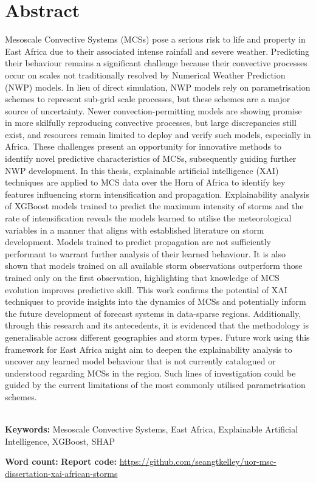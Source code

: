 \chapter*{\center \Large  Abstract}

\noindent
Mesoscale Convective Systems (MCSs) pose a serious risk to life and property in East Africa due to their associated intense rainfall and severe weather. Predicting their behaviour remains a significant challenge because their convective processes occur on scales not traditionally resolved by Numerical Weather Prediction (NWP) models. In lieu of direct simulation, NWP models rely on parametrisation schemes to represent sub-grid scale processes, but these schemes are a major source of uncertainty. Newer convection-permitting models are showing promise in more skilfully reproducing convective processes, but large discrepancies still exist, and resources remain limited to deploy and verify such models, especially in Africa. These challenges present an opportunity for innovative methods to identify novel predictive characteristics of MCSs, subsequently guiding further NWP development. In this thesis, explainable artificial intelligence (XAI) techniques are applied to MCS data over the Horn of Africa to identify key features influencing storm intensification and propagation. Explainability analysis of XGBoost models trained to predict the maximum intensity of storms and the rate of intensification reveals the models learned to utilise the meteorological variables in a manner that aligns with established literature on storm development. Models trained to predict propagation are not sufficiently performant to warrant further analysis of their learned behaviour. It is also shown that models trained on all available storm observations outperform those trained only on the first observation, highlighting that knowledge of MCS evolution improves predictive skill. This work confirms the potential of XAI techniques to provide insights into the dynamics of MCSs and potentially inform the future development of forecast systems in data-sparse regions. Additionally, through this research and its antecedents, it is evidenced that the methodology is generalisable across different geographies and storm types. Future work using this framework for East Africa might aim to deepen the explainability analysis to uncover any learned model behaviour that is not currently catalogued or understood regarding MCSs in the region. Such lines of investigation could be guided by the current limitations of the most commonly utilised parametrisation schemes.

~\\[1cm]
\noindent
\textbf{Keywords:} Mesoscale Convective Systems, East Africa, Explainable Artificial Intelligence, XGBoost, SHAP

\vfill
\noindent
\textbf{Word count:}  \newline
\newline
\noindent
\textbf{Report code:} \href{https://github.com/seangtkelley/uor-msc-dissertation-xai-african-storms}{https://github.com/seangtkelley/uor-msc-dissertation-xai-african-storms}  \newline

